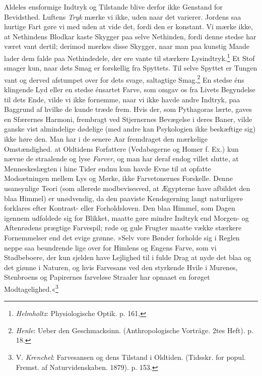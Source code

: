 \documentclass[12pt,a4paper,openany]{book}
\newcommand{\opage}[1]{\marginnote{\footnotesize\textit{[#1]}}}
\begin{document}
\opage{140}Aldeles ensformige Indtryk og Tilstande blive derfor ikke
Genstand for Bevidsthed. Luftens \emph{Tryk} mærke vi ikke, uden naar
det varierer. Jordens saa hurtige Fart gøre vi med uden at vide det,
fordi den er konstant. Vi mærke ikke, at Nethindens Blodkar kaste
Skygger paa selve Nethinden, fordi denne stedse har været vant dertil;
derimod mærkes disse Skygger, naar man paa kunstig Maade lader dem falde
paa Nethindedele, der ere vante til stærkere
Lysindtryk.\footnote[1]{\emph{Helmholtz}: Physiologische Optik. p. 161,}
Et Stof smager kun, naar dets Smag er forskellig fra Spyttets. Til selve
Spyttet er Tungen vant og derved afstumpet over for dets svage,
saltagtige Smag.\footnote[2]{\emph{Henle}: Ueber den Geschmacksinn.
(Anthropologische Vorträge. 2tes Heft). p. 18.} En stedse éns klingende
Lyd eller en stedse énsartet Farve, som omgav os fra Livets Begyndelse
til dets Ende, vilde vi ikke fornemme, naar vi ikke havde andre Indtryk,
paa Baggrund af hvilke de kunde træde frem. Hvis der, som Pythagoras
lærte, gaves en Sfærernes Harmoni, frembragt ved Stjernernes Bevægelse i
deres Baner, vilde ganske vist almindelige dødelige (med andre kan
Psykologien ikke beskæftige sig) ikke høre den. Man har i de senere Aar
fremdraget den mærkelige Omstændighed. at Oldtidens Forfattere
(Vedabøgerne og Homer f. Ex.) kun nævne de straalende og lyse
\emph{Farver}, og man har deraf endog villet slutte, at Menneskeslægten
i hine Tider endnu kun havde Evne til at opfatte Modsætningen mellem Lys
og Mørke, ikke Farvetonernes Forskelle. Denne usansynlige Teori (som
allerede modbevisesved, at Ægypterne have afbildet den blaa Himmel) er
unødvendig, da den paaviste Kendsgerning langt naturligere forklares
efter Kontrast- eller Forholdsloven. Den blaa Himmel, som Dagen igennem
udfoldede sig for Blikket, maatte gøre mindre Indtryk end Morgen- og
Aftenrødens prægtige Farvespil; røde og gule Frugter maatte vække
stærkere Fornemmelser end det evige grønne. »Selv vore Bønder forholde
sig i Reglen neppe saa beundrende lige over for Himlens og Engens Farve,
som vi Stadbeboere, der kun sjelden have Lejlighed til i fulde Drag at
nyde det blaa og det giønne i Naturen, og hvis Farvesans ved den
styrkende Hvile i Murenes, Stenbroens
\opage{141}og Papirernes farveløse Straaler har opnaaet en forøget
Modtagelighed.«\footnote[1]{V. \emph{Krenchel}: Farvesansen og dens
Tilstand i Oldtiden. (Tidsskr. for popul. Fremst. af Naturvidenskaben.
1879). p. 153.}
\end{document}
